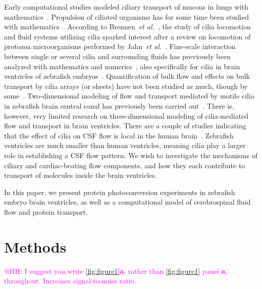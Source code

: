 \documentclass[fleqn]{wlscirep}
\newcommand{\mer}[1]{\textcolor{magenta}{#1}}
\begin{document}
Early computational studies modeled ciliary transport of mucous in lungs with mathematics~\cite{Fulford1986Muco-ciliaryLung}. Propulsion of ciliated organisms has for some time been studied with mathematics~\cite{BLAKE1974MechanicsMotion}. According to Brennen~\emph{et al.}~\cite{Brennen1977FluidFlagella}, the study of cilia locomotion and fluid systems utilizing cilia sparked interest after a review on locomotion of protozoa microorganisms performed by Jahn~\emph{et al.}~\cite{Jahn1972LocomotionProtozoa}. Fine-scale interaction between single or several cilia and surrounding fluids has previously been analyzed with mathematics and numerics~\cite{Guo2020SimulatingGeometries, Ruvalcaba2021NumericalTree, Smith2009MathematicalFluids, Cui2019NumericalMethod, Cui2022AFlow}, also specifically for cilia in brain ventricles of zebrafish embryos~\cite{Salman2022ComputationalEmbryo}. Quantification of bulk flow and effects on bulk transport by cilia arrays (or sheets) have not been studied as much, though by some~\cite{Ramirez-SanJuan2020Multi-scaleArrays}. Two-dimensional modeling of flow and transport mediated by motile cilia in zebrafish brain central canal has previously been carried out~\cite{Thouvenin2020OriginCanal}. There is, however, very limited research on three-dimensional modeling of cilia-mediated flow and transport in brain ventricles. There are a couple of studies indicating that the effect of cilia on CSF flow is local in the human brain~\cite{Siyahhan2014FlowVentricles, Yoshida2022EffectVentricles}. Zebrafish ventricles are much smaller than human ventricles, meaning cilia play a larger role in establishing a CSF flow pattern. We wish to investigate the mechanisms of ciliary and cardiac-beating flow components, and how they each contribute to transport of molecules inside the brain ventricles.

In this paper, we present protein photoconversion experiments in zebrafish embryo brain ventricles, as well as a computational model of cerebrospinal fluid flow and protein transport.

\section*{Methods}
\label{sec:methods}

\mer{@HH: I suggest you write \cref{fig:figure1}\textbf{a}, rather than \cref{fig:figure1} panel \textbf{a}, throughout. Increases signal-to-noise ratio.}
\end{document}
